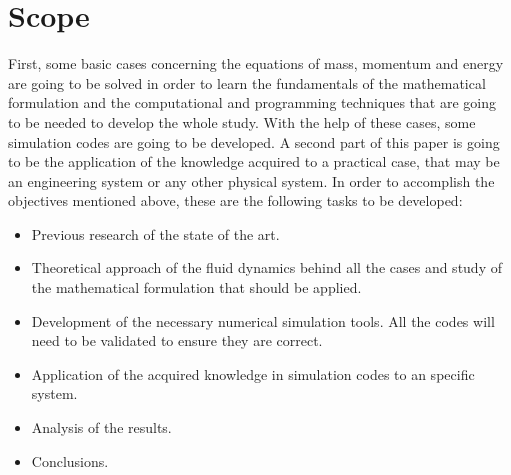 

\section{Scope}
First, some basic cases concerning the equations of mass, momentum and energy are going to be solved in order to learn the fundamentals of the mathematical formulation and the computational and programming techniques that are going to be needed to develop the whole study. With the help of these cases, some simulation codes are going to be developed.
\newline
\newline
A second part of this paper is going to be the application of the knowledge acquired to a practical case, that may be an engineering system or any other physical system.
\newline
\newline
In order to accomplish the objectives mentioned above, these are the following tasks to be developed:
\begin{itemize}
	\item Previous research of the state of the art.
	\item Theoretical approach of the fluid dynamics behind all the cases and study of the mathematical formulation that should be applied.
	\item Development of the necessary numerical simulation tools. All the codes will need to be validated to ensure they are correct.
	\item Application of the acquired knowledge in simulation codes to an specific system.
	\item Analysis of the results.
	\item Conclusions.
\end{itemize}
